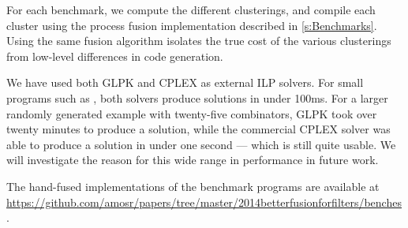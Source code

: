 For each benchmark, we compute the different clusterings, and compile each cluster using the process fusion implementation described in \cref{s:Benchmarks}.
Using the same fusion algorithm isolates the true cost of the various clusterings from low-level differences in code generation.

We have used both GLPK and CPLEX as external ILP solvers.
For small programs such as \Hs@normalizeInc@, both solvers produce solutions in under 100ms.
For a larger randomly generated example with twenty-five combinators, GLPK took over twenty minutes to produce a solution, while the commercial CPLEX solver was able to produce a solution in under one second --- which is still quite usable.
We will investigate the reason for this wide range in performance in future work.


The hand-fused implementations of the benchmark programs are available at \url{https://github.com/amosr/papers/tree/master/2014betterfusionforfilters/benches}.



